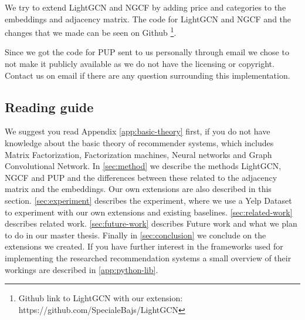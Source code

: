 We try to extend LightGCN and NGCF by adding price and categories to the embeddings and adjacency matrix.
The code for LightGCN and NGCF and the changes that we made can be seen on Github \footnote{Github link to LightGCN with our extension: https://github.com/SpecialeBajs/LightGCN}.

Since we got the code for PUP sent to us personally through email we chose to not make it publicly available as we do not have the licensing or copyright.
Contact us on email if there are any question surrounding this implementation.

\subsection{Reading guide}
We suggest you read Appendix \ref{app:basic-theory} first, if you do not have knowledge about the basic theory of recommender systems, which includes Matrix Factorization, Factorization machines, Neural networks and Graph Convolutional Network.
In \autoref{sec:method} we describe the methods LightGCN, NGCF and PUP and the differences between these related to the adjacency matrix and the embeddings.
Our own extensions are also described in this section.
\autoref{sec:experiment} describes the experiment, where we use a Yelp Dataset to experiment with our own extensions and existing baselines.
\autoref{sec:related-work} describes related work.
\autoref{sec:future-work} describes Future work and what we plan to do in our master thesis.
Finally in \autoref{sec:conclusion} we conclude on the extensions we created.
If you have further interest in the frameworks used for implementing the researched recommendation systems a small overview of their workings are described in \autoref{app:python-lib}.